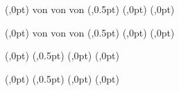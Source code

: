 \newcommand{\footerOrnament}{\adfflourishleftdouble{} \adfast3{} \adfflourishrightdouble{}}

	{(\textwidth,0pt)
		{\pagemark{} von \pageref{lastPage}\hfill}
		{\hfill\pagemark{} von \pageref{lastPage}}
		{\hfill\pagemark{} von \pageref{lastPage}}
	(\textwidth,0.5pt)}
	{(\textwidth,0pt) 
		{\hfill}
		{\hfill}
		{\decorativeLine{\footerOrnament{}}{2pt}}
	(\textwidth,0pt)}

	{(\textwidth,0pt)
		{\hfill\pagemark{} von \pageref{lastPage}\hfill\rightmark}
		{\leftmark\hfill\pagemark{} von \pageref{lastPage}\hfill}
		{\leftmark\hfill\pagemark{} von \pageref{lastPage}}
	(\textwidth,0.5pt)}
	{(\textwidth,0pt) 
		{\hfill}
		{\hfill}
		{\decorativeLine{\footerOrnament{}}{2pt}}
	(\textwidth,0pt)}


	{(\textwidth,0pt)
		{\pagemark\hfill}
		{\hfill\pagemark}
		{\hfill\pagemark}
	(\textwidth,0.5pt)}
	{(\textwidth,0pt) 
		{\hfill}
		{\hfill}
		{\decorativeLine{\footerOrnament{}}{2pt}}
	(\textwidth,0pt)}

	{(\textwidth,0pt)
		{\pagemark\hfill\rightmark}
		{\leftmark\hfill\pagemark}
		{\leftmark\hfill\pagemark}
	(\textwidth,0.5pt)}
	{(\textwidth,0pt) 
		{\hfill}
		{\hfill}
		{\decorativeLine{\footerOrnament{}}{2pt}}
	(\textwidth,0pt)}

%
%




